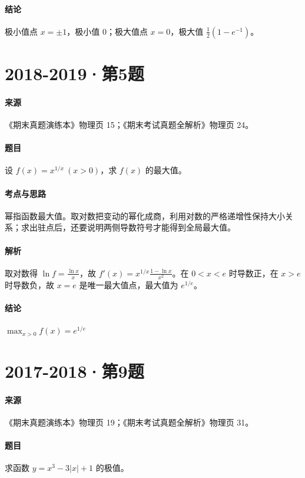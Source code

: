 \documentclass[UTF8,fontset=fandol,12pt,oneside,openany]{ctexrep}
\theoremstyle{definition}
\begin{document}
\paragraph{结论}
极小值点 $x=\pm1$，极小值 $0$；极大值点 $x=0$，极大值 $\frac12(1-e^{-1})$。

\par\addvspace{18pt}\noindent\begin{minipage}{\linewidth}
\section{2018-2019·第5题}
\paragraph{来源}《期末真题演练本》物理页 15；《期末考试真题全解析》物理页 24。
\paragraph{题目}
设 $f(x)=x^{1/x}\ (x>0)$，求 $f(x)$ 的最大值。
\end{minipage}\par
\paragraph{考点与思路}
幂指函数最大值。取对数把变动的幂化成商，利用对数的严格递增性保持大小关系；求出驻点后，还要说明两侧导数符号才能得到全局最大值。
\paragraph{解析}
取对数得 $\ln f=\frac{\ln x}x$，故 $f'(x)=x^{1/x}\frac{1-\ln x}{x^2}$。在 $0<x<e$ 时导数正，在 $x>e$ 时导数负，故 $x=e$ 是唯一最大值点，最大值为 $e^{1/e}$。
\paragraph{结论}
$\max_{x>0}f(x)=e^{1/e}$

\par\addvspace{18pt}\noindent\begin{minipage}{\linewidth}
\section{2017-2018·第9题}
\paragraph{来源}《期末真题演练本》物理页 19；《期末考试真题全解析》物理页 31。
\paragraph{题目}
求函数 $y=x^3-3\lvert x\rvert+1$ 的极值。
\end{minipage}\par
\end{document}
